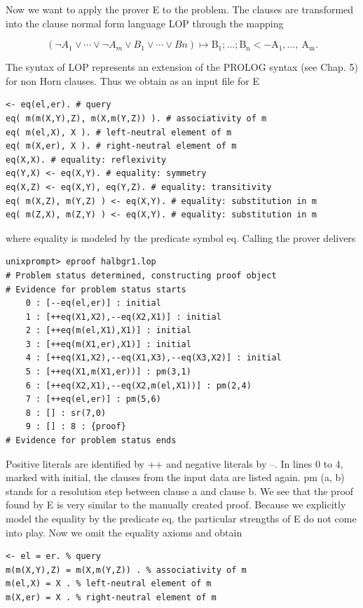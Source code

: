 \documentclass[10pt]{book}
\begin{document}
Now we want to apply the prover E to the problem. The clauses are transformed into the clause normal form language LOP through the mapping

$$
\left(\neg A_{1} \vee \cdots \vee \neg A_{m} \vee B_{1} \vee \cdots \vee B n\right) \mapsto \mathrm{B}_{1} ; \ldots ; \mathrm{B}_{\mathrm{n}}<-\mathrm{A}_{1}, \ldots, \mathrm{~A}_{\mathrm{m}} .
$$

The syntax of LOP represents an extension of the PROLOG syntax (see Chap. 5) for non Horn clauses. Thus we obtain as an input file for E

\begin{verbatim}
<- eq(el,er). # query
eq( m(m(X,Y),Z), m(X,m(Y,Z)) ). # associativity of m
eq( m(el,X), X ). # left-neutral element of m
eq( m(X,er), X ). # right-neutral element of m
eq(X,X). # equality: reflexivity
eq(Y,X) <- eq(X,Y). # equality: symmetry
eq(X,Z) <- eq(X,Y), eq(Y,Z). # equality: transitivity
eq( m(X,Z), m(Y,Z) ) <- eq(X,Y). # equality: substitution in m
eq( m(Z,X), m(Z,Y) ) <- eq(X,Y). # equality: substitution in m
\end{verbatim}

where equality is modeled by the predicate symbol eq. Calling the prover delivers

\begin{verbatim}
unixprompt> eproof halbgr1.lop
# Problem status determined, constructing proof object
# Evidence for problem status starts
    0 : [--eq(el,er)] : initial
    1 : [++eq(X1,X2),--eq(X2,X1)] : initial
    2 : [++eq(m(el,X1),X1)] : initial
    3 : [++eq(m(X1,er),X1)] : initial
    4 : [++eq(X1,X2),--eq(X1,X3),--eq(X3,X2)] : initial
    5 : [++eq(X1,m(X1,er))] : pm(3,1)
    6 : [++eq(X2,X1),--eq(X2,m(el,X1))] : pm(2,4)
    7 : [++eq(el,er)] : pm(5,6)
    8 : [] : sr(7,0)
    9 : [] : 8 : {proof}
# Evidence for problem status ends
\end{verbatim}

Positive literals are identified by ++ and negative literals by --. In lines 0 to 4, marked with initial, the clauses from the input data are listed again. pm (a, b) stands for a resolution step between clause a and clause b. We see that the proof found by E is very similar to the manually created proof. Because we explicitly model the equality by the predicate eq, the particular strengths of E do not come into play. Now we omit the equality axioms and obtain

\begin{verbatim}
<- el = er. % query
m(m(X,Y),Z) = m(X,m(Y,Z)) . % associativity of m
m(el,X) = X . % left-neutral element of m
m(X,er) = X . % right-neutral element of m
\end{verbatim}
\end{document}
